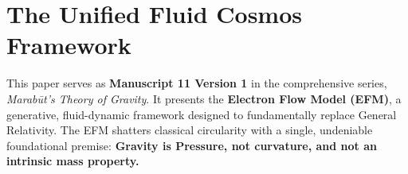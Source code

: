 \documentclass[11pt, a4paper, table]{article}
\begin{document}
\clearpage
\section*{The Unified Fluid Cosmos Framework}
  This paper serves as \textbf{Manuscript 11 Version 1} in the comprehensive series, \textit{Marab\={u}t's Theory of Gravity}. It presents the \textbf{Electron Flow Model (EFM)}, a generative, fluid-dynamic framework designed to fundamentally replace General Relativity. The EFM shatters classical circularity with a single, undeniable foundational premise: \textbf{Gravity is Pressure, not curvature, and not an intrinsic mass property.}
\end{document}
